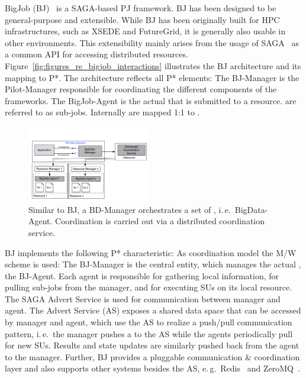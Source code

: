 \documentclass[conference]{IEEEtran}
\begin{document}

BigJob (BJ)~\cite{bigjob_web,saga_bigjob_condor_cloud} is a SAGA-based PJ
framework. BJ has been designed to be general-purpose and extensible. While BJ
has been originally built for HPC infrastructures, such as XSEDE and
FutureGrid, it is generally also usable in other environments. This
extensibility mainly arises from the usage of SAGA~\cite{saga_url,ogf-gfd-90} 
as a common API for accessing distributed resources. 
Figure~\ref{fig:figures_re_bigjob_interactions} illustrates the
BJ architecture and its mapping to P*. The architecture reflects
all P* elements: The BJ-Manager is the Pilot-Manager responsible for
coordinating the different components of the frameworks. The
BigJob-Agent is the actual \pilot that is submitted to a
resource. \cus are referred to as sub-jobs. Internally \cus are mapped
1:1 to \sus.


\begin{figure}[t]
	\up\up\upp
	\centering
	\includegraphics[width=0.48\textwidth]{../figures/bigdata_pmr.pdf}
	\caption{ Similar to BJ, a BD-Manager orchestrates a set of \pilots, i.\,e.\ BigData-Agent. Coordination is carried out via a distributed coordination service. \up\up }
	\label{fig:bigdata}
\end{figure}


BJ implements the following P* characteristic: As coordination model
the M/W scheme is used: The BJ-Manager is the central entity, which
manages the actual \pilot, the BJ-Agent. Each agent is responsible for
gathering local information, for pulling sub-jobs from the manager,
and for executing SUs on its local resource. The SAGA Advert Service
is used for communication between manager and agent. The Advert
Service (AS) exposes a shared data space that can be accessed by
manager and agent, which use the AS to realize a push/pull
communication pattern, i.\,e.\ the manager pushes a \su to the AS while
the agents periodically pull for new SUs. Results and state updates
are similarly pushed back from the agent to the manager. Further, BJ
provides a pluggable communication \& coordination layer and also
supports other \cc systems besides the AS, e.\,g.\ Redis~\cite{redis}
and ZeroMQ~\cite{zmq}.
\end{document}
